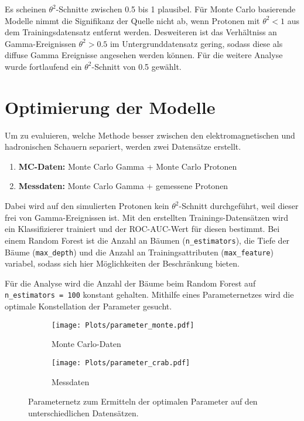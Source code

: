 Es scheinen $\theta^{2}$-Schnitte zwischen \num{0.5} bis \num{1} plausibel. 
Für Monte Carlo basierende Modelle nimmt die Signifikanz der Quelle nicht ab, wenn Protonen mit $\theta^{2} < \num{1}$ aus dem Trainingsdatensatz entfernt werden. 
Desweiteren ist das Verhältniss an Gamma-Ereignissen $\theta^{2} > \num{0.5}$ im Untergrunddatensatz gering, sodass diese als diffuse Gamma Ereignisse angesehen werden können. 
Für die weitere Analyse wurde fortlaufend ein $\theta^{2}$-Schnitt von \num{0.5} gewählt. 
\newpage
\section{Optimierung der Modelle}
Um zu evaluieren, welche Methode besser zwischen den elektromagnetischen und hadronischen Schauern separiert, werden zwei Datensätze erstellt. 
\begin{enumerate}
  \item \textbf{MC-Daten:} Monte Carlo Gamma + Monte Carlo Protonen
  \item \textbf{Messdaten:} Monte Carlo Gamma + gemessene Protonen 
\end{enumerate}
Dabei wird auf den simulierten Protonen kein $\theta^{2}$-Schnitt durchgeführt, weil dieser frei von Gamma-Ereignissen ist.
Mit den erstellten Trainings-Datensätzen wird ein Klassifizierer trainiert und der ROC-AUC-Wert für diesen bestimmt.
Bei einem Random Forest ist die Anzahl an Bäumen (\texttt{n\_estimators}), die Tiefe der Bäume (\texttt{max\_depth}) und die Anzahl an Trainingsattributen (\texttt{max\_feature}) variabel, sodass sich hier Möglichkeiten der Beschränkung bieten.

Für die Analyse wird die Anzahl der Bäume beim Random Forest auf \texttt{n\_estimators = 100} konstant gehalten. 
Mithilfe eines Parameternetzes wird die optimale Konstellation der Parameter gesucht. 
\begin{figure}
  \begin{subfigure}[b]{0.5\textwidth}
	\texttt{[image: Plots/parameter\_monte.pdf]}
	\caption{Monte Carlo-Daten}
	\label{fig:mcGrid}
  \end{subfigure}
  \begin{subfigure}[b]{0.5\textwidth}
	\texttt{[image: Plots/parameter\_crab.pdf]}
	\caption{Messdaten}
	\label{fig:messGrid}
  \end{subfigure}
  \caption{Parameternetz zum Ermitteln der optimalen Parameter auf den unterschiedlichen Datensätzen.}
\end{figure}

